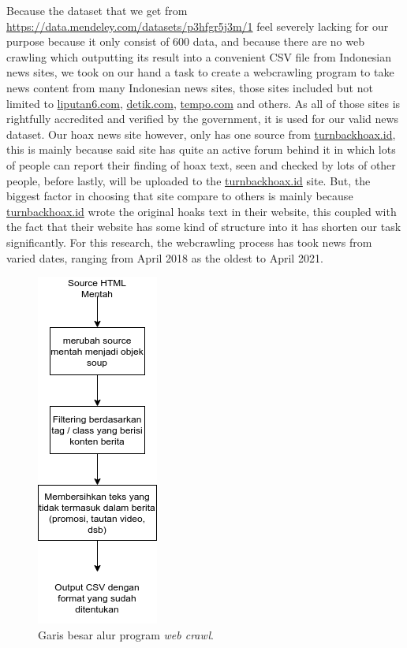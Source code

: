 Because the dataset that we get from \url{https://data.mendeley.com/datasets/p3hfgr5j3m/1} feel severely lacking for our purpose because it only consist of 600 data, and because there are no web crawling which outputting its result into a convenient CSV file from Indonesian news sites, we took on our hand a task to create a webcrawling program to take news content from many Indonesian news sites, those sites included but not limited to \url{liputan6.com}, \url{detik.com}, \url{tempo.com} and others. As all of those sites is rightfully accredited and verified by the government, it is used for our valid news dataset. Our hoax news site however, only has one source from \url{turnbackhoax.id}, this is mainly because said site has quite an active forum behind it in which lots of people can report their finding of hoax text, seen and checked by lots of other people, before lastly, will be uploaded to the \url{turnbackhoax.id} site. But, the biggest factor in choosing that site compare to others is mainly because \url{turnbackhoax.id} wrote the original hoaks text in their website, this coupled with the fact that their website has some kind of structure into it has shorten our task significantly. For this research, the webcrawling process has took news from varied dates, ranging from April 2018 as the oldest to April 2021.

\begin{figure} [h]
    \centering
    \includegraphics[width=0.35\linewidth]{gambar/webcrawl_long.png}
    \caption{Garis besar alur program \textit{web crawl}.}
    \label{fig:webcrawl_method}
\end{figure}

